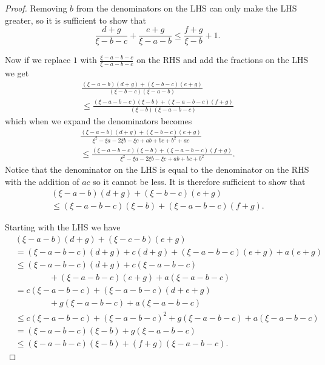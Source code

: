 \documentclass[a4paper]{report}
\begin{document}
\begin{proof}
  Removing $b$ from the denominators on the LHS can only make the LHS
  greater, so it is sufficient to show that
  \begin{equation*}
    \frac{d+g}{\xi -b-c} + \frac{e+g}{\xi -a-b} \leq \frac{f+g}{\xi -b} + 1.
  \end{equation*}

  Now if we replace $1$ with $\frac{\xi -a-b-c}{\xi -a-b-c}$ on the RHS and add
  the fractions on the LHS we get
  \begin{multline*}
    \frac{(\xi -a-b)(d+g)+(\xi -b-c)(e+g)}{(\xi -b-c)(\xi -a-b)}\\
    \leq \frac{(\xi -a-b-c)(\xi -b)+(\xi -a-b-c)(f+g)}{(\xi -b)(\xi -a-b-c)}
  \end{multline*}
  which when we expand the denominators becomes
  \begin{multline*}
    \frac{(\xi -a-b)(d+g)+(\xi -b-c)(e+g)}{\xi ^2-\xi a-2\xi b-\xi c+ab+bc+b^2+ac}\\
    \leq \frac{(\xi -a-b-c)(\xi -b)+(\xi -a-b-c)(f+g)}{\xi ^2-\xi a-2\xi b-\xi c+ab+bc+b^2}.
  \end{multline*}
  Notice that the denominator on the LHS is equal to the denominator on the
  RHS with the addition of $ac$ so it cannot be less.  It is therefore
  sufficient to show that
  \begin{multline*}
    (\xi -a-b)(d+g)+(\xi -b-c)(e+g)\\
    \leq (\xi -a-b-c)(\xi -b)+(\xi -a-b-c)(f+g).
  \end{multline*}

  Starting with the LHS we have
  \begin{align*}
    &(\xi -a-b)(d+g)+(\xi -c-b)(e+g)\\
    &= (\xi -a-b-c)(d+g)+c(d+g)+(\xi -a-b-c)(e+g)+a(e+g)\\
    &\leq (\xi -a-b-c)(d+g)+c(\xi -a-b-c)\\
    &\qquad\qquad+(\xi -a-b-c)(e+g)+a(\xi -a-b-c)\\
    &= c(\xi -a-b-c)+(\xi -a-b-c)(d+e+g)\\
    &\qquad\qquad+g(\xi -a-b-c)+a(\xi -a-b-c)\\
    &\leq c(\xi -a-b-c)+(\xi -a-b-c)^2+g(\xi -a-b-c)+a(\xi -a-b-c)\\
    &= (\xi -a-b-c)(\xi -b)+g(\xi -a-b-c)\\
    &\leq (\xi -a-b-c)(\xi -b) + (f+g)(\xi -a-b-c).
  \end{align*}
\end{proof}
\end{document}
